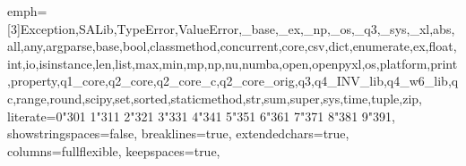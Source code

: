 {  emph={[3]Exception,SALib,TypeError,ValueError,_base,_ex,_np,_os,_q3,_sys,_xl,abs,all,any,argparse,base,bool,classmethod,concurrent,core,csv,dict,enumerate,ex,float,int,io,isinstance,len,list,max,min,mp,np,nu,numba,open,openpyxl,os,platform,print,property,q1_core,q2_core,q2_core_c,q2_core_orig,q3,q4_INV_lib,q4_w6_lib,qc,range,round,scipy,set,sorted,staticmethod,str,sum,super,sys,time,tuple,zip},%
  literate={0}{{\color{pynum}\char"30}}1 {1}{{\color{pynum}\char"31}}1 {2}{{\color{pynum}\char"32}}1 {3}{{\color{pynum}\char"33}}1 {4}{{\color{pynum}\char"34}}1 {5}{{\color{pynum}\char"35}}1 {6}{{\color{pynum}\char"36}}1 {7}{{\color{pynum}\char"37}}1 {8}{{\color{pynum}\char"38}}1 {9}{{\color{pynum}\char"39}}1,%
  showstringspaces=false,%
  breaklines=true,%
  extendedchars=true,%
  columns=fullflexible,%
  keepspaces=true,%
}
